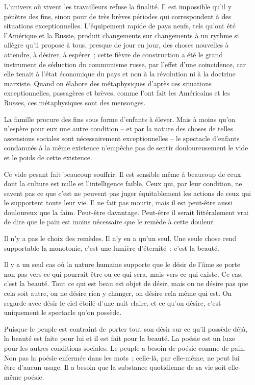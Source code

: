 \documentclass[french,twoside]{book} %
\begin{document}
L'univers où vivent les travailleurs refuse la finalité. Il est impossible qu'il y pénètre des fins, sinon pour de très brèves périodes qui correspondent à des situations exceptionnelles. L'équipement rapide de pays neufs, tels qu'ont été l'Amérique et la Russie, produit changements sur changements à un rythme si allègre qu'il propose à tous, presque de jour en jour, des choses nouvelles à attendre, à désirer, à espérer ; cette fièvre de construction a été le grand instrument de séduction du communisme russe, par l'effet d'une coïncidence, car elle tenait à l'état économique du pays et non à la révolution ni à la doctrine marxiste. Quand on élabore des métaphysiques d'après ces situations exceptionnelles, passagères et brèves, comme l'ont fait les Américains et les Russes, ces métaphysiques sont des mensonges.\par
La famille procure des fins sous forme d'enfants à élever. Mais à moins qu'on n'espère pour eux une autre condition – et par la nature des choses de telles ascensions sociales sont nécessairement exceptionnelles – le spectacle d'enfants condamnés à la même existence n'empêche pas de sentir douloureusement le vide et le poids de cette existence.\par
Ce vide pesant fait beaucoup souffrir. Il est sensible même à beaucoup de ceux dont la culture est nulle et l'intelligence faible. Ceux qui, par leur condition, ne savent pas ce que c'est ne peuvent pas juger équitablement les actions de ceux qui le supportent toute leur vie. Il ne fait pas mourir, mais il est peut-être aussi douloureux que la faim. Peut-être davantage. Peut-être il serait littéralement vrai de dire que le pain est moins nécessaire que le remède à cette douleur.\par
Il n'y a pas le choix des remèdes. Il n'y en a qu'un seul. Une seule chose rend supportable la monotonie, c'est une lumière d'éternité ; c'est la beauté.\par
Il y a un seul cas où la nature humaine supporte que le désir de l'âme se porte non pas vers ce qui pourrait être ou ce qui sera, mais vers ce qui existe. Ce cas, c'est la beauté. Tout ce qui est beau est objet de désir, mais on ne désire pas que cela soit autre, on ne désire rien y changer, on désire cela même qui est. On regarde avec désir le ciel étoilé d'une nuit claire, et ce qu'on désire, c'est uniquement le spectacle qu'on possède.\par
Puisque le peuple est contraint de porter tout son désir sur ce qu'il possède déjà, la beauté est faite pour lui et il est fait pour la beauté. La poésie est un luxe pour les autres conditions sociales. Le peuple a besoin de poésie comme de pain. Non pas la poésie enfermée dans les mots ; celle-là, par elle-même, ne peut lui être d'aucun usage. Il a besoin que la substance quotidienne de sa vie soit elle-même poésie.\par
\end{document}
